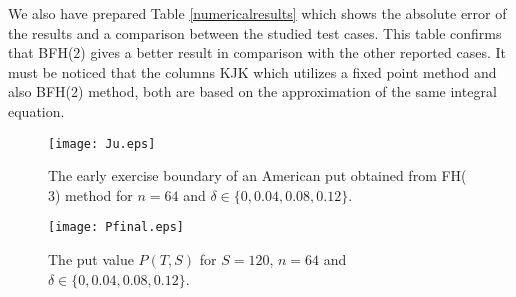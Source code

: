 \documentclass[fleqn,final,3p,11pt]{elsarticle}
\theoremstyle{definition}
\theoremstyle{remark}
\numberwithin{equation}{section}
\begin{document}
We also have prepared Table \ref{numericalresults} which shows the absolute error of the results and a comparison between the studied test cases. This table confirms that BFH($2$) gives a better result in comparison with the other reported cases. It must be noticed that the columns KJK which utilizes a fixed point method and also BFH($2$) method, both are based on the approximation of the same integral equation.
\begin{figure}[ht]
\begin{center}
\texttt{[image: Ju.eps]}
\caption{The early exercise boundary of an American put obtained from FH($3$) method for $n=64$ and $\delta \in \{0, 0.04, 0.08, 0.12\}.$}
\label{boundary}
\end{center}
\end{figure}
\begin{figure}[ht]
	\begin{center}
		\texttt{[image: Pfinal.eps]}
		\caption{The put value $P(T, S)$ for $S= 120$, $n=64$ and  $\delta \in \{0, 0.04, 0.08, 0.12\}$. }
		\label{putvalue}
	\end{center}
\end{figure}
\end{document}
